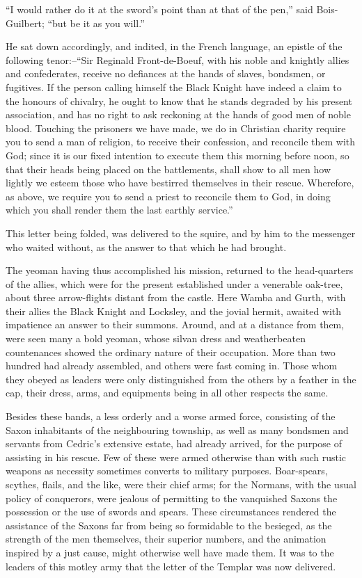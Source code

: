 ``I would rather do it at the sword's point than at that of the pen,''
said Bois-Guilbert; ``but be it as you will.''

He sat down accordingly, and indited, in the French language, an epistle
of the following tenor:--``Sir Reginald Front-de-Boeuf, with his noble
and knightly allies and confederates, receive no defiances at the hands
of slaves, bondsmen, or fugitives. If the person calling himself the
Black Knight have indeed a claim to the honours of chivalry, he ought to
know that he stands degraded by his present association, and has no
right to ask reckoning at the hands of good men of noble blood. Touching
the prisoners we have made, we do in Christian charity require you to
send a man of religion, to receive their confession, and reconcile them
with God; since it is our fixed intention to execute them this morning
before noon, so that their heads being placed on the battlements, shall
show to all men how lightly we esteem those who have bestirred
themselves in their rescue. Wherefore, as above, we require you to send
a priest to reconcile them to God, in doing which you shall render them
the last earthly service.''

This letter being folded, was delivered to the squire, and by him to the
messenger who waited without, as the answer to that which he had
brought.

The yeoman having thus accomplished his mission, returned to the
head-quarters of the allies, which were for the present established
under a venerable oak-tree, about three arrow-flights distant from the
castle. Here Wamba and Gurth, with their allies the Black Knight and
Locksley, and the jovial hermit, awaited with impatience an answer to
their summons. Around, and at a distance from them, were seen many a
bold yeoman, whose silvan dress and weatherbeaten countenances showed
the ordinary nature of their occupation. More than two hundred had
already assembled, and others were fast coming in. Those whom they
obeyed as leaders were only distinguished from the others by a feather
in the cap, their dress, arms, and equipments being in all other
respects the same.

Besides these bands, a less orderly and a worse armed force, consisting
of the Saxon inhabitants of the neighbouring township, as well as many
bondsmen and servants from Cedric's extensive estate, had already
arrived, for the purpose of assisting in his rescue. Few of these were
armed otherwise than with such rustic weapons as necessity sometimes
converts to military purposes. Boar-spears, scythes, flails, and the
like, were their chief arms; for the Normans, with the usual policy of
conquerors, were jealous of permitting to the vanquished Saxons the
possession or the use of swords and spears. These circumstances rendered
the assistance of the Saxons far from being so formidable to the
besieged, as the strength of the men themselves, their superior numbers,
and the animation inspired by a just cause, might otherwise well have
made them. It was to the leaders of this motley army that the letter of
the Templar was now delivered.

